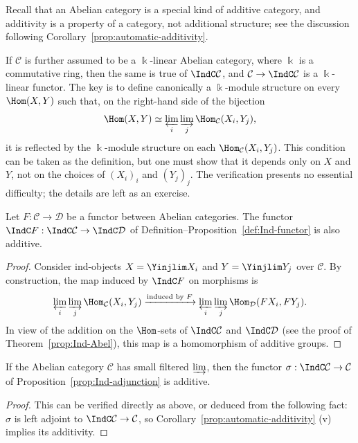 Recall that an Abelian category is a special kind of additive category, and additivity is a property of a category, not additional structure; see the discussion following Corollary~\ref{prop:automatic-additivity}.

\begin{remark}\label{rem:Ind-k-linear}
	If $\mathcal{C}$ is further assumed to be a $\Bbbk$-linear Abelian category, where $\Bbbk$ is a commutative ring, then the same is true of $\IndC\mathcal{C}$, and $\mathcal{C}\to\IndC\mathcal{C}$ is a $\Bbbk$-linear functor. The key is to define canonically a $\Bbbk$-module structure on every $\Hom(X,Y)$ such that, on the right-hand side of the bijection
	\[ \Hom(X, Y) \simeq \varprojlim_i \varinjlim_j \Hom_{\mathcal{C}}(X_i, Y_j), \]
	it is reflected by the $\Bbbk$-module structure on each $\Hom_{\mathcal{C}}(X_i,Y_j)$. This condition can be taken as the definition, but one must show that it depends only on $X$ and $Y$, not on the choices of $(X_i)_i$ and $(Y_j)_j$. The verification presents no essential difficulty; the details are left as an exercise.
\end{remark}

\begin{lemma}
	Let $F:\mathcal{C}\to\mathcal{D}$ be a functor between Abelian categories. The functor $\IndC F:\IndC\mathcal{C}\to\IndC\mathcal{D}$ of Definition--Proposition~\ref{def:Ind-functor} is also additive.
\end{lemma}
\begin{proof}
	Consider ind-objects $X=\Yinjlim X_i$ and $Y=\Yinjlim Y_j$ over $\mathcal{C}$. By construction, the map induced by $\IndC F$ on morphisms is
	\[ \varprojlim_i \varinjlim_j \Hom_{\mathcal{C}}(X_i, Y_j) \xrightarrow{\text{induced by $F$}} \varprojlim_i \varinjlim_j \Hom_{\mathcal{D}}(FX_i, FY_j). \]
	In view of the addition on the $\Hom$-sets of $\IndC\mathcal{C}$ and $\IndC\mathcal{D}$ (see the proof of Theorem~\ref{prop:Ind-Abel}), this map is a homomorphism of additive groups.
\end{proof}

\begin{lemma}
	If the Abelian category $\mathcal{C}$ has small filtered $\varinjlim$, then the functor $\sigma:\IndC\mathcal{C}\to\mathcal{C}$ of Proposition~\ref{prop:Ind-adjunction} is additive.
\end{lemma}
\begin{proof}
	This can be verified directly as above, or deduced from the following fact: $\sigma$ is left adjoint to $\IndC\mathcal{C}\to\mathcal{C}$, so Corollary~\ref{prop:automatic-additivity} (v) implies its additivity.
\end{proof}

